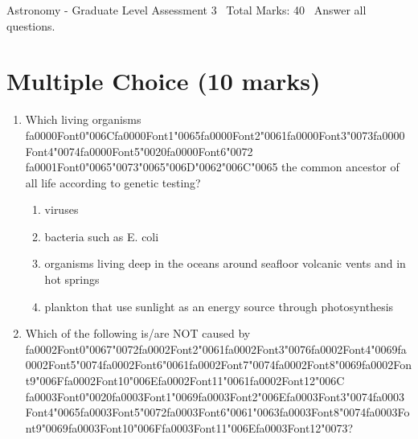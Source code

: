 \documentclass[12pt]{article}
\begin{document}
\begin{center}
Astronomy - Graduate Level Assessment 3 \
Total Marks: 40 \
Answer all questions.
\end{center}

\section*{Multiple Choice (10 marks)}
\begin{enumerate}[label=\arabic*.]
\item Which living organisms {\csname fa0000Font0\endcsname\char"006C}{\csname fa0000Font1\endcsname\char"0065}{\csname fa0000Font2\endcsname\char"0061}{\csname fa0000Font3\endcsname\char"0073}{\csname fa0000Font4\endcsname\char"0074}{\csname fa0000Font5\endcsname\char"0020}{\csname fa0000Font6\endcsname\char"0072} {\csname fa0001Font0\endcsname\char"0065}{\char"0073}{\char"0065}{\char"006D}{\char"0062}{\char"006C}{\char"0065} the common ancestor of all life according to genetic
testing?
\begin{enumerate}[label=(\alph*)]
    \item viruses
    \item bacteria such as E. coli
    \item organisms living deep in the oceans around seafloor volcanic vents and in hot springs
    \item plankton that use sunlight as an energy source through photosynthesis
\end{enumerate}
\item Which of the following is/are NOT caused by {\csname fa0002Font0\endcsname\char"0067}{\char"0072}{\csname fa0002Font2\endcsname\char"0061}{\csname fa0002Font3\endcsname\char"0076}{\csname fa0002Font4\endcsname\char"0069}{\csname fa0002Font5\endcsname\char"0074}{\csname fa0002Font6\endcsname\char"0061}{\csname fa0002Font7\endcsname\char"0074}{\csname fa0002Font8\endcsname\char"0069}{\csname fa0002Font9\endcsname\char"006F}{\csname fa0002Font10\endcsname\char"006E}{\csname fa0002Font11\endcsname\char"0061}{\csname fa0002Font12\endcsname\char"006C} {\csname fa0003Font0\endcsname\char"0020}{\csname fa0003Font1\endcsname\char"0069}{\csname fa0003Font2\endcsname\char"006E}{\csname fa0003Font3\endcsname\char"0074}{\csname fa0003Font4\endcsname\char"0065}{\csname fa0003Font5\endcsname\char"0072}{\csname fa0003Font6\endcsname\char"0061}{\char"0063}{\csname fa0003Font8\endcsname\char"0074}{\csname fa0003Font9\endcsname\char"0069}{\csname fa0003Font10\endcsname\char"006F}{\csname fa0003Font11\endcsname\char"006E}{\csname fa0003Font12\endcsname\char"0073}?

\end{enumerate}
\end{document}
